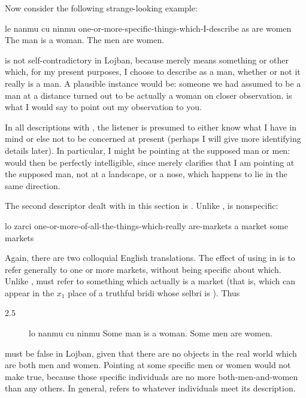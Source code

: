 Now consider the following strange-looking example:
\begin{example}
le nanmu cu ninmu\n
one-or-more-specific-things-which-I-describe as \n
\T	are women\n
The man is a woman.\n
The men are women.
\end{example}

 is not self-contradictory in
    Lojban, because  merely means something or other
    which, for my present purposes, I choose to describe as a man,
    whether or not it really is a man. A plausible instance would
    be: someone we had assumed to be a man at a distance turned out
    to be actually a woman on closer observation.  is what I would say to point out
    my observation to you. 

In all descriptions with , the listener is presumed to
    either know what I have in mind or else not to be concerned at
    present (perhaps I will give more identifying details later).
    In particular, I might be pointing at the supposed man or men:
     would then be perfectly
    intelligible, since  merely clarifies that I am
    pointing at the supposed man, not at a landscape, or a nose,
    which happens to lie in the same direction.

The second descriptor dealt with in this section is .
    Unlike ,  is nonspecific:
\begin{example}
lo zarci\n
one-or-more-of-all-the-things-which-really are-markets\n
a market\n
some markets
\end{example}

Again, there are two colloquial English translations. The
    effect of using  in  is to
    refer generally to one or more markets, without being specific
    about which. Unlike ,  must refer to
    something which actually is a market (that is, which can appear
    in the $x_1$ place of a truthful bridi whose selbri is ).
    Thus 
\begin{description}
\item[2.5] lo nanmu cu ninmu Some man is a woman. Some men are women.
\end{description}

must be false in Lojban, given that there are no objects in the
    real world which are both men and women. Pointing at some
    specific men or women would not make  true, because those specific individuals are no more
    both-men-and-women than any others. In general,  refers
    to whatever individuals meet its description. 


